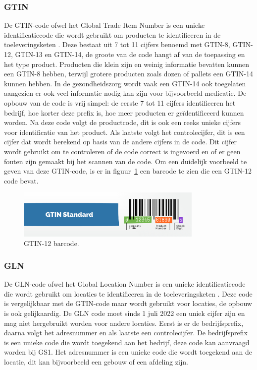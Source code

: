 \subsubsection{GTIN}
De GTIN-code ofwel het Global Trade Item Number is een unieke identificatiecode die wordt gebruikt om producten te identificeren in de toeleveringsketen \autocite{GTIN2025}.
Deze bestaat uit 7 tot 11 cijfers benoemd met GTIN-8, GTIN-12, GTIN-13 en GTIN-14, de groote van de code hangt af van de toepassing en het type product.
Producten die klein zijn en weinig informatie bevatten kunnen een GTIN-8 hebben, terwijl grotere producten zoals dozen of pallets een GTIN-14 kunnen hebben.
In de gezondheidszorg wordt vaak een GTIN-14 ook toegelaten aangezien er ook veel informatie nodig kan zijn voor bijvoorbeeld medicatie.
De opbouw van de code is vrij simpel: de eerste 7 tot 11 cijfers identificeren het bedrijf, hoe korter deze prefix is, hoe meer producten er geïdentificeerd kunnen worden.
Na deze code volgt de productcode, dit is ook een reeks unieke cijfers voor identificatie van het product.
Als laatste volgt het controlecijfer, dit is een cijfer dat wordt berekend op basis van de andere cijfers in de code.
Dit cijfer wordt gebruikt om te controleren of de code correct is ingevoerd en of er geen fouten zijn gemaakt bij het scannen van de code.
Om een duidelijk voorbeeld te geven van deze GTIN-code, is er in figuur~\ref{fig:barcorde} een barcode te zien die een GTIN-12 code bevat.


\begin{figure}[H]
     \centering
     \includegraphics[width=0.8\textwidth]{./img/barcode_gtin12.jpg}
     \caption[GTIN-12 barcode]{\label{fig:barcorde} GTIN-12 barcode. }
\end{figure}

\subsubsection{GLN}
De GLN-code ofwel het Global Location Number is een unieke identificatiecode die wordt gebruikt om locaties te identificeren in de toeleveringsketen \autocite{GLN}.
Deze code is vergelijkbaar met de GTIN-code maar wordt gebruikt voor locaties, de opbouw is ook gelijkaardig.
De GLN code moet sinds 1 juli 2022 een uniek cijfer zijn en mag niet hergebruikt worden voor andere locaties.
Eerst is er de bedrijfsprefix, daarna volgt het adresnummer en als laatste een controlecijfer.
De bedrijfsprefix is een unieke code die wordt toegekend aan het bedrijf, deze code kan aanvraagd worden bij GS1. Het adresnummer is een unieke code die wordt toegekend aan de locatie, dit kan bijvoorbeeld een gebouw of een afdeling zijn.

